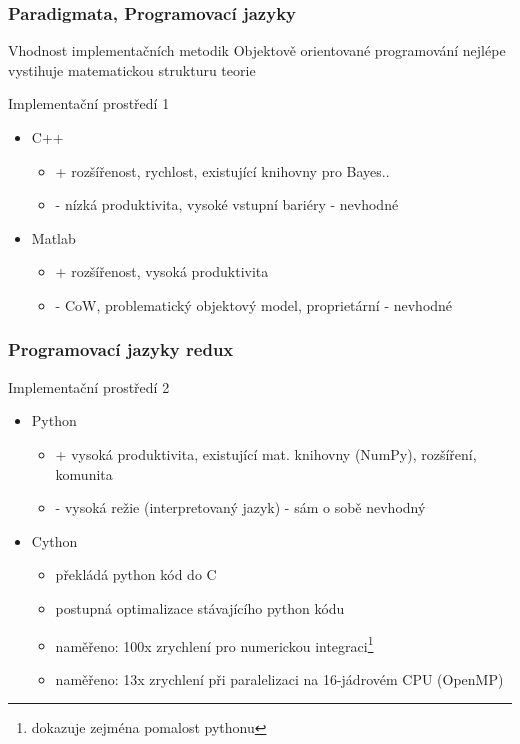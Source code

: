 \documentclass[12pt]{beamer}
\begin{document}
\begin{frame}
	\frametitle{Paradigmata, Programovací jazyky}

	\begin{block}{Vhodnost implementačních metodik}
		Objektově orientované programování nejlépe vystihuje matematickou strukturu teorie
	\end{block}

	\begin{block}{Implementační prostředí 1}
		\begin{itemize}
			\item C++
			\begin{itemize}
				\item + rozšířenost, rychlost, existující knihovny pro Bayes..
				\item - nízká produktivita, vysoké vstupní bariéry - nevhodné
			\end{itemize}
			\item Matlab
			\begin{itemize}
				\item + rozšířenost, vysoká produktivita
				\item - CoW, problematický objektový model, proprietární - nevhodné
			\end{itemize}
		\end{itemize}
	\end{block}
\end{frame}

\begin{frame}
	\frametitle{Programovací jazyky redux}

	\begin{block}{Implementační prostředí 2}
		\begin{itemize}
			\item Python
			\begin{itemize}
				\item + vysoká produktivita, existující mat. knihovny (NumPy), rozšíření, komunita
				\item - vysoká režie (interpretovaný jazyk) - sám o sobě nevhodný
			\end{itemize}
			\item Cython
			\begin{itemize}
				\item překládá python kód do C
				\item postupná optimalizace stávajícího python kódu
				\item naměřeno: 100x zrychlení pro numerickou integraci\footnote{dokazuje zejména pomalost pythonu}
				\item naměřeno: 13x zrychlení při paralelizaci na 16-jádrovém CPU (OpenMP)
			\end{itemize}
		\end{itemize}
	\end{block}
\end{frame}
\end{document}
